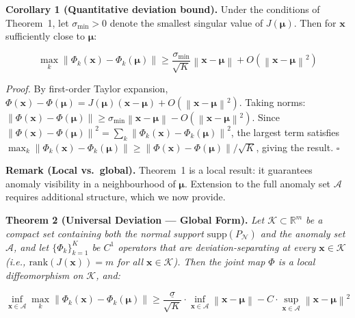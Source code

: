 \documentclass[journal]{IEEEtran}
\newcommand{\R}{\mathbb{R}}
\newcommand{\norm}[1]{\left\lVert#1\right\rVert}
\begin{document}
\vspace{0.5em}

\textbf{Corollary 1 (Quantitative deviation bound).} Under the conditions of Theorem~1, let $\sigma_{\min} > 0$ denote the smallest singular value of $J(\boldsymbol{\mu})$. Then for $\mathbf{x}$ sufficiently close to $\boldsymbol{\mu}$:

\begin{equation}
\max_{k} \norm{\Phi_k(\mathbf{x}) - \Phi_k(\boldsymbol{\mu})} \geq \frac{\sigma_{\min}}{\sqrt{K}} \norm{\mathbf{x} - \boldsymbol{\mu}} + O(\norm{\mathbf{x} - \boldsymbol{\mu}}^2)
\label{eq:quantitative}
\end{equation}

\textit{Proof.} By first-order Taylor expansion, $\Phi(\mathbf{x}) - \Phi(\boldsymbol{\mu}) = J(\boldsymbol{\mu})(\mathbf{x} - \boldsymbol{\mu}) + O(\norm{\mathbf{x}-\boldsymbol{\mu}}^2)$. Taking norms: $\norm{\Phi(\mathbf{x}) - \Phi(\boldsymbol{\mu})} \geq \sigma_{\min} \norm{\mathbf{x} - \boldsymbol{\mu}} - O(\norm{\mathbf{x}-\boldsymbol{\mu}}^2)$. Since $\norm{\Phi(\mathbf{x}) - \Phi(\boldsymbol{\mu})}^2 = \sum_k \norm{\Phi_k(\mathbf{x}) - \Phi_k(\boldsymbol{\mu})}^2$, the largest term satisfies $\max_k \norm{\Phi_k(\mathbf{x}) - \Phi_k(\boldsymbol{\mu})} \geq \norm{\Phi(\mathbf{x}) - \Phi(\boldsymbol{\mu})}/\sqrt{K}$, giving the result. $\square$

\textbf{Remark (Local vs.\ global).} Theorem~1 is a local result: it guarantees anomaly visibility in a neighbourhood of $\boldsymbol{\mu}$. Extension to the full anomaly set $\mathcal{A}$ requires additional structure, which we now provide.

\vspace{0.5em}

\textbf{Theorem 2 (Universal Deviation --- Global Form).} \textit{Let $\mathcal{K} \subset \R^m$ be a compact set containing both the normal support $\text{supp}(P_{\mathcal{N}})$ and the anomaly set $\mathcal{A}$, and let $\{\Phi_k\}_{k=1}^K$ be $C^1$ operators that are deviation-separating at every $\mathbf{x} \in \mathcal{K}$ (i.e., $\text{rank}(J(\mathbf{x})) = m$ for all $\mathbf{x} \in \mathcal{K}$). Then the joint map $\Phi$ is a local diffeomorphism on $\mathcal{K}$, and:}

\begin{equation}
\inf_{\mathbf{x} \in \mathcal{A}} \max_{k} \norm{\Phi_k(\mathbf{x}) - \Phi_k(\boldsymbol{\mu})} \geq \frac{\underline{\sigma}}{\sqrt{K}} \cdot \inf_{\mathbf{x} \in \mathcal{A}} \norm{\mathbf{x} - \boldsymbol{\mu}} - C \cdot \sup_{\mathbf{x} \in \mathcal{A}} \norm{\mathbf{x} - \boldsymbol{\mu}}^2
\label{eq:global}
\end{equation}
\end{document}
